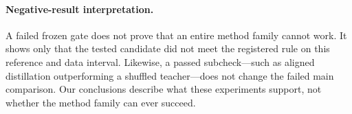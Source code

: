 \paragraph{Negative-result interpretation.}
A failed frozen gate does not prove that an entire method family cannot work. It shows only that the tested candidate did not meet the registered rule on this reference and data interval. Likewise, a passed subcheck---such as aligned distillation outperforming a shuffled teacher---does not change the failed main comparison. Our conclusions describe what these experiments support, not whether the method family can ever succeed.
